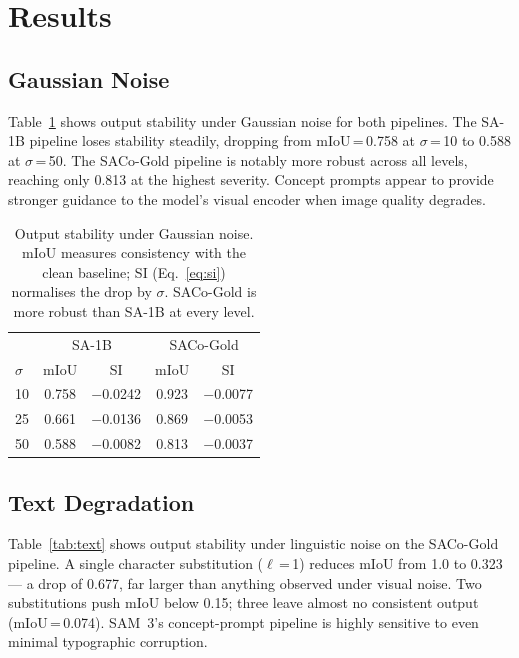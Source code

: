\documentclass[10pt,twocolumn,letterpaper]{article}
\begin{document}
\section{Results}
\label{sec:results}

\subsection{Gaussian Noise}
\label{sec:results-gaussian}

Table~\ref{tab:gaussian} shows output stability under Gaussian noise for both
pipelines.  The SA-1B pipeline loses stability steadily, dropping from mIoU\,=\,0.758 at $\sigma$\,=\,10 to
0.588 at $\sigma$\,=\,50.  The SACo-Gold pipeline
is notably more robust across all levels, reaching only 0.813 at the
highest severity.  Concept prompts appear to provide stronger guidance to the model's visual encoder when image quality degrades.

\begin{table}[h]
\centering
\small
\begin{tabular}{lcccc}
\hline
& \multicolumn{2}{c}{SA-1B} & \multicolumn{2}{c}{SACo-Gold} \\
$\sigma$ & mIoU & SI & mIoU & SI \\
\hline
10 & 0.758 & $-$0.0242 & 0.923 & $-$0.0077 \\
25 & 0.661 & $-$0.0136 & 0.869 & $-$0.0053 \\
50 & 0.588 & $-$0.0082 & 0.813 & $-$0.0037 \\
\hline
\end{tabular}
\vspace{3pt}
\caption{Output stability under Gaussian noise.
         mIoU measures consistency with the clean baseline;
         SI (Eq.~\ref{eq:si}) normalises the drop by $\sigma$.
         SACo-Gold is more robust than SA-1B at every level.}
\label{tab:gaussian}
\end{table}

\subsection{Text Degradation}
\label{sec:results-text}

Table~\ref{tab:text} shows output stability under linguistic noise on the
SACo-Gold pipeline.  A single character substitution ($\ell$\,=\,1) reduces
mIoU from 1.0 to 0.323 — a drop of 0.677, far larger than anything observed
under visual noise.  Two substitutions push mIoU below 0.15; three leave
almost no consistent output (mIoU\,=\,0.074).  SAM~3's concept-prompt
pipeline is highly sensitive to even minimal typographic corruption.
\end{document}

